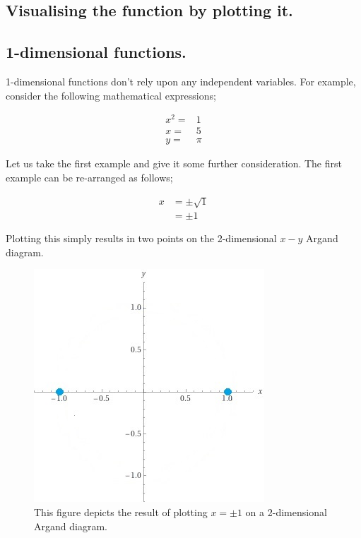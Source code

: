 \documentclass{article}
\begin{document}
\subsection{Visualising the function by plotting it.}




\subsection{1-dimensional functions.}

1-dimensional functions don't rely upon any independent variables. For example, consider the following
mathematical expressions;

\begin{align*}
x^{2} =& 1 \\
x     =& 5 \\
y     =& \pi
\end{align*}

Let us take the first example and give it some further consideration. The first example can be re-arranged
as follows;

\begin{align*}
x &= \pm\sqrt{1} \\
  &= \pm1
\end{align*}

Plotting this simply results in two points on the 2-dimensional $x-y$ Argand diagram.

\begin{figure}
  \includegraphics[scale=1.5]{images/Plus_and_minus_one.jpg}
  \caption{This figure depicts the result of plotting $x = \pm1$ on a 2-dimensional Argand diagram.}
  \label{fig:Plus_and_minus_one}
\end{figure}
\end{document}
